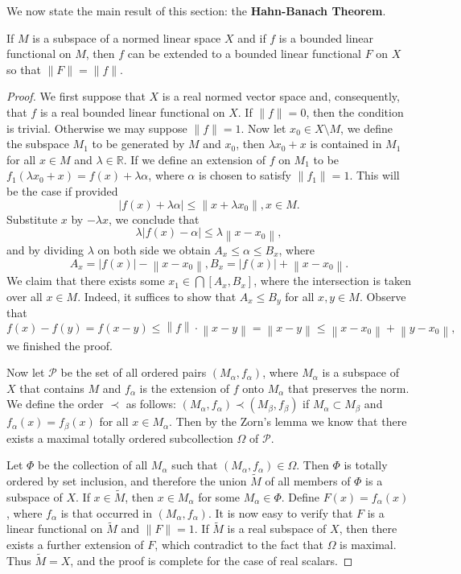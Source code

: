 We now state the main result of this section: the \textbf{Hahn-Banach Theorem}.
\begin{theorem}
If $M$ is a subspace of a normed linear space $X$ and if $f$ is a bounded linear functional on $M$, then $f$ can be extended to a bounded linear functional $F$ on $X$ so that $\|F\|=\|f\|$.
\end{theorem}
\begin{proof}
We first suppose that $X$ is a real normed vector space and, consequently, that $f$ is a real bounded linear functional on $X$. If $\|f\|=0$, then the condition is trivial. Otherwise we may suppose $\|f\|=1$. Now let $x_0\in X\setminus M$, we define the subspace $M_1$ to be generated by $M$ and $x_0$, then $\lambda x_0+x$ is contained in $M_1$ for all $x\in M$ and $\lambda\in\mathbb{R}$. If we define an extension of $f$ on $M_1$ to be $f_1(\lambda x_0+x)=f(x)+\lambda\alpha$, where $\alpha$ is chosen to satisfy $\|f_1\|=1$. This will be the case if provided 
$$
\left| f\left( x \right) +\lambda \alpha \right|\le \left\| x+\lambda x_0 \right\| ,x\in M.
$$
Substitute $x$ by $-\lambda x$, we conclude that 
$$
\lambda \left| f\left( x \right) -\alpha \right|\le \lambda \left\| x-x_0 \right\| ,
$$
and by dividing $\lambda$ on both side we obtain $A_x\le\alpha\le B_x$, where 
$$
A_x=\left| f\left( x \right) \right|-\left\| x-x_0 \right\| ,B_x=\left| f\left( x \right) \right|+\left\| x-x_0 \right\| .
$$
We claim that there exists some $x_1\in\bigcap[A_x,B_x]$, where the intersection is taken over all $x\in M$. Indeed, it suffices to show that $A_x\le B_y$ for all $x,y\in M$. Observe that 
$$
f\left( x \right) -f\left( y \right) =f\left( x-y \right) \le \left\| f \right\| \cdot \left\| x-y \right\| =\left\| x-y \right\| \le \left\| x-x_0 \right\| +\left\| y-x_0 \right\| ,
$$
we finished the proof.\par
Now let $\mathcal{P}$ be the set of all ordered pairs $(M_\alpha,f_\alpha)$, where $M_\alpha$ is a subspace of $X$ that contains $M$ and $f_\alpha$ is the extension of $f$ onto $M_\alpha$ that preserves the norm. We define the order $\prec$ as follows: $(M_\alpha,f_\alpha)\prec(M_\beta,f_\beta)$ if $M_\alpha\subset M_\beta$ and $f_\alpha(x)=f_\beta(x)$ for all $x\in M_\alpha$. Then by the Zorn's lemma we know that there exists a maximal totally ordered subcollection $\Omega$ of $\mathcal{P}$.\par
Let $\Phi$ be the collection of all $M_\alpha$ such that $(M_\alpha,f_\alpha)\in\Omega$. Then $\Phi$ is totally ordered by set inclusion, and therefore the union $\widetilde{M}$ of all members of $\Phi$ is a subspace of $X$. If $x\in\widetilde{M}$, then $x\in M_\alpha$ for some $M_\alpha\in\Phi$. Define $F(x)=f_\alpha(x)$, where $f_\alpha$ is that occurred in $(M_\alpha,f_\alpha)$. It is now easy to verify that $F$ is a linear functional on $\widetilde{M}$ and $\|F\|=1$. If $\widetilde{M}$ is a real subspace of $X$, then there exists a further extension of $F$, which contradict to the fact that $\Omega$ is maximal. Thus $\widetilde{M}=X$, and the proof is complete for the case of real scalars.\par

\end{proof}
